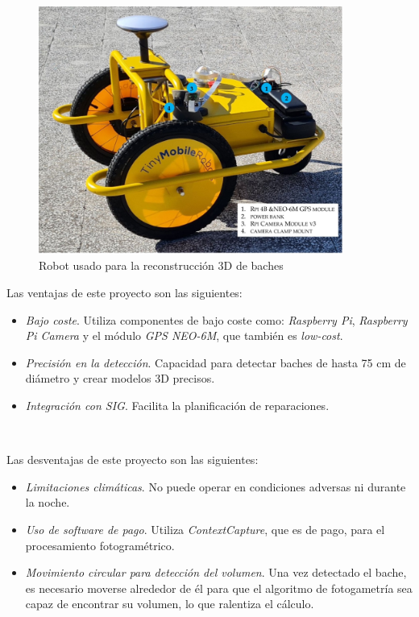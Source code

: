 \begin{figure} [h!]
	\begin{center}
		\includegraphics[width=10cm]{figs/infrarob.png}
	\end{center}
	\caption{Robot usado para la reconstrucción 3D de baches}
\label{fig:infrarob}
\end{figure}

Las ventajas de este proyecto son las siguientes: 
\begin{itemize}
	\item \textit{Bajo coste}. Utiliza componentes de bajo coste como: \textit{Raspberry Pi}, \textit{Raspberry Pi Camera} y el módulo \textit{GPS NEO-6M}, que también es \textit{low-cost}. 
	\item \textit{Precisión en la detección}. Capacidad para detectar baches de hasta 75 cm de diámetro y crear modelos 3D precisos.
	\item \textit{Integración con \acs{SIG}}. Facilita la planificación de reparaciones.
	
\end{itemize}\

Las desventajas de este proyecto son las siguientes: 
\begin{itemize}
	\item \textit{Limitaciones climáticas}. No puede operar en condiciones adversas ni durante la noche.
	\item \textit{Uso de software de pago}. Utiliza \textit{ContextCapture}, que es de pago, para el procesamiento fotogramétrico.
	\item \textit{Movimiento circular para detección del volumen}. Una vez detectado el bache, es necesario moverse alrededor de él para que el algoritmo de fotogametría sea capaz de encontrar su volumen, lo que ralentiza el cálculo.
	
\end{itemize}\

